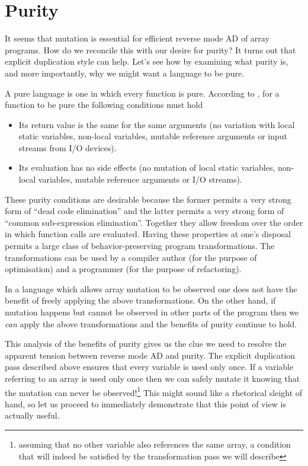 \documentclass[12pt]{article}
\begin{document}

\section{Purity}

It seems that mutation is essential for efficient reverse mode AD of
array programs.  How do we reconcile this with our desire for purity?
It turns out that explicit duplication style can help.  Let's see how
by examining what purity is, and more importantly, why we might want a
language to be pure.

A pure language is one in which every function is pure.  According to
\cite{purity}, for a function to be pure the following conditions must
hold

\begin{itemize}
  \item
    Its return value is the same for the same arguments (no variation
    with local static variables, non-local variables, mutable
    reference arguments or input streams from I/O devices).

  \item
    Its evaluation has no side effects (no mutation of local
    static variables, non-local variables, mutable reference
    arguments or I/O streams).
\end{itemize}

These purity conditions are desirable because the former permits a
very strong form of ``dead code elimination'' and the latter permits a
very strong form of ``common sub-expression elimination''.  Together
they allow freedom over the order in which function calls are
evaluated.  Having these properties at one's disposal permits a large
class of behavior-preserving program transformations.  The
transformations can be used by a compiler author (for the purpose of
optimisation) and a programmer (for the purpose of refactoring).

In a language which allows array mutation to be observed one does not
have the benefit of freely applying the above transformations.  On the
other hand, if mutation happens but cannot be observed in other parts
of the program then we \emph{can} apply the above transformations and
the benefits of purity continue to hold.

This analysis of the benefits of purity gives us the clue we need to
resolve the apparent tension between reverse mode AD and purity.  The
explicit duplication pass described above ensures that every variable
is used only once.  If a variable referring to an array is used only
once then we can safely mutate it knowing that the mutation can never
be observed!\footnote{assuming that no other variable also references
  the same array, a condition that will indeed be satisfied by the
  transformation pass we will describe} This might sound like a rhetorical
sleight of hand, so let us proceed to immediately demonstrate that
this point of view is actually useful.
\end{document}
